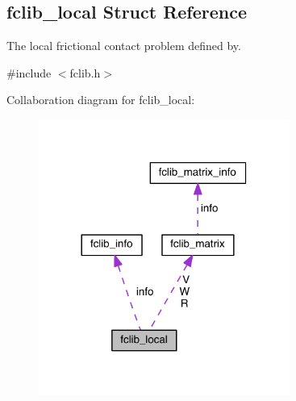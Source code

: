 \hypertarget{structfclib__local}{}\subsection{fclib\+\_\+local Struct Reference}
\label{structfclib__local}


The local frictional contact problem defined by.  




{\ttfamily \#include $<$fclib.\+h$>$}



Collaboration diagram for fclib\+\_\+local\+:
\nopagebreak
\begin{figure}[H]
\begin{center}
\leavevmode
\includegraphics[width=233pt]{structfclib__local__coll__graph}
\end{center}
\end{figure}
